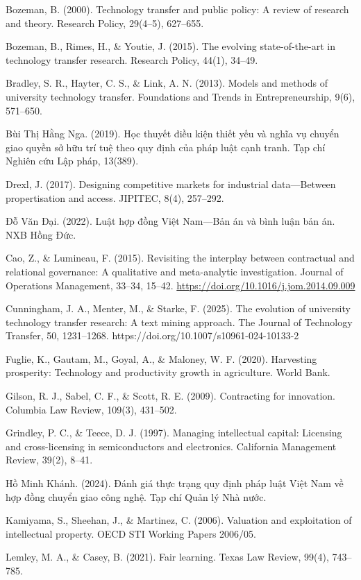 \documentclass[
]{article}
\begin{document}
Bozeman, B. (2000). Technology transfer and public policy: A review of
research and theory. Research Policy, 29(4--5), 627--655.

Bozeman, B., Rimes, H., \& Youtie, J. (2015). The evolving
state-of-the-art in technology transfer research. Research Policy,
44(1), 34--49.

Bradley, S. R., Hayter, C. S., \& Link, A. N. (2013). Models and methods
of university technology transfer. Foundations and Trends in
Entrepreneurship, 9(6), 571--650.

Bùi Thị Hằng Nga. (2019). Học thuyết điều kiện thiết yếu và nghĩa vụ
chuyển giao quyền sở hữu trí tuệ theo quy định của pháp luật cạnh tranh.
Tạp chí Nghiên cứu Lập pháp, 13(389).

Drexl, J. (2017). Designing competitive markets for industrial
data---Between propertisation and access. JIPITEC, 8(4), 257--292.

Đỗ Văn Đại. (2022). Luật hợp đồng Việt Nam---Bản án và bình luận bản án.
NXB Hồng Đức.

Cao, Z., \& Lumineau, F. (2015). Revisiting the interplay between
contractual and relational governance: A qualitative and meta-analytic
investigation. Journal of Operations Management, 33--34, 15--42.
\url{https://doi.org/10.1016/j.jom.2014.09.009}

Cunningham, J. A., Menter, M., \& Starke, F. (2025). The evolution of
university technology transfer research: A text mining approach. The
Journal of Technology Transfer, 50, 1231--1268.
https://doi.org/10.1007/s10961-024-10133-2

Fuglie, K., Gautam, M., Goyal, A., \& Maloney, W. F. (2020). Harvesting
prosperity: Technology and productivity growth in agriculture. World
Bank.

Gilson, R. J., Sabel, C. F., \& Scott, R. E. (2009). Contracting for
innovation. Columbia Law Review, 109(3), 431--502.

Grindley, P. C., \& Teece, D. J. (1997). Managing intellectual capital:
Licensing and cross-licensing in semiconductors and electronics.
California Management Review, 39(2), 8--41.

Hồ Minh Khánh. (2024). Đánh giá thực trạng quy định pháp luật Việt Nam
về hợp đồng chuyển giao công nghệ. Tạp chí Quản lý Nhà nước.

Kamiyama, S., Sheehan, J., \& Martinez, C. (2006). Valuation and
exploitation of intellectual property. OECD STI Working Papers 2006/05.

Lemley, M. A., \& Casey, B. (2021). Fair learning. Texas Law Review,
99(4), 743--785.
\end{document}
